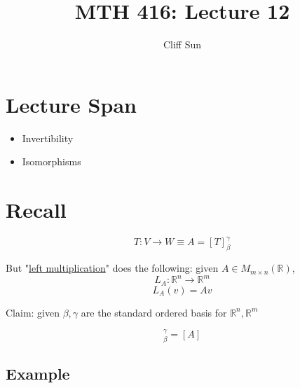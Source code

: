 \documentclass{article}
\title{MTH 416: Lecture 12}
\author{Cliff Sun}
\newtheorem{one minute paper}[theorem]{One Minute Paper}
\begin{document}
\maketitle

\section*{Lecture Span}
\begin{itemize}
    \item Invertibility
    \item Isomorphisms
\end{itemize}

\section*{Recall}

\begin{equation}
    T: V \rightarrow W \equiv A = [T]_\beta^\gamma
\end{equation}

But "\underline{left multiplication}" does the following: given $A \in M_{m \times n}(\mathbb{R})$, 
\begin{equation}
    L_A : \mathbb{R}^n \rightarrow \mathbb{R}^m
\end{equation}
\begin{equation}
    L_A(v) = Av
\end{equation}

Claim: given $\beta, \gamma$ are the standard ordered basis for $\mathbb{R}^n, \mathbb{R}^m$

\begin{equation}
    [L_A]_\beta^\gamma = [A]
\end{equation}

\subsection*{Example}
\end{document}
